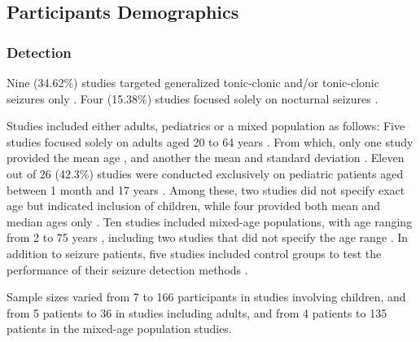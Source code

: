 \subsection{Participants Demographics}
\subsubsection{Detection}
Nine (34.62\%) studies targeted generalized tonic-clonic and/or tonic-clonic seizures only \cite{Milosevic2016-ee,Wang2022-lt,De_Cooman2018-pq,Poh2012-af,Vakilna2024-hk,Larsen2024-vn,Li2022-ty,Xu2022-tx,Wang2025-my}. Four (15.38\%) studies focused solely on nocturnal seizures \cite{Van_Andel2017-yx,De_Cooman2018-pq,Gheryani2017-yg,Larsen2024-vn}.

Studies included either adults, pediatrics or a mixed population as follows: Five studies \cite{Cogan2017-lg,Hamlin2021-sd,Chowdhury2022-bi,Ali2020-ke,Vakilna2024-hk} focused solely on adults aged 20 \cite{Chowdhury2022-bi} to 64 years \cite{Cogan2017-lg}. From which, only one study provided the mean age \cite{Hamlin2021-sd}, and another the mean and standard deviation \cite{Vakilna2024-hk}. Eleven out of 26 (42.3\%) studies \cite{Yu2023-ss,Milosevic2016-ee,Hegarty-Craver2021-hk,De_Cooman2018-pq,Poh2012-af,Wu2024-yl,Gheryani2017-yg,Ge2023-ab,Wang2025-ql,Jiang2022-zu,Tang2021-td} were conducted exclusively on pediatric patients aged between 1 month \cite{Jiang2022-zu} and 17 years \cite{Hegarty-Craver2021-hk}. Among these, two studies \cite{De_Cooman2018-pq,Milosevic2016-ee} did not specify exact age but indicated inclusion of children, while four provided both mean and median ages only \cite{Yu2023-ss,Poh2012-af,Ge2023-ab,Tang2021-td}. Ten studies \cite{Regalia2019-ch,Nasseri2021-xn,Van_Andel2017-yx,Arends2018-ew,Wang2022-lt,Larsen2024-vn,Dong2022-oo,Li2022-ty,Xu2022-tx,Wang2025-my} included mixed-age populations, with age ranging from 2 \cite{Van_Andel2017-yx} to 75 years \cite{Larsen2024-vn}, including two studies that did not specify the age range \cite{Xu2022-tx,Nasseri2021-xn}. In addition to seizure patients, five studies included control groups to test the performance of their seizure detection methods \cite{Van_Andel2017-yx,Vakilna2024-hk,Wang2022-lt,Larsen2024-vn,Wang2025-my}. 

Sample sizes varied from 7 \cite{De_Cooman2018-pq} to 166 participants \cite{Yu2023-ss} in studies involving children, and from 5 patients \cite{Ali2020-ke} to 36 \cite{Vakilna2024-hk} in studies including adults, and from 4 patients \cite{Li2022-ty} to 135 patients \cite{Regalia2019-ch} in the mixed-age population studies. 

